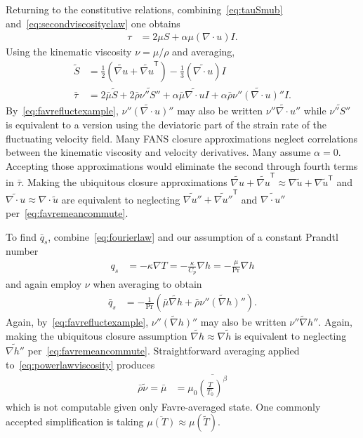 \documentclass[letterpaper,11pt,nointlimits,reqno,draft]{amsart}
\newcommand{\trans}[1]{{#1}^{\ensuremath{\mathsf{T}}}}
\newcommand{\Prandtl}[1][]{\ensuremath{\mbox{Pr}_{#1}}}
\begin{document}
Returning to the constitutive relations, combining~\eqref{eq:tauSmub}
and~\eqref{eq:secondviscosityclaw} one obtains
\begin{align}
  \tau
&= 2 \mu{} S + \alpha \mu \left( \nabla\cdot{}u \right) I.
\end{align}
Using the kinematic viscosity $\nu = \mu / \rho$ and averaging,
\begin{align}
   \tilde{S}
&=
     \frac{1}{2}\left(
       \widetilde{\nabla{}u} + \trans{\widetilde{\nabla{}u}}
     \right)
   - \frac{1}{3}\left(\widetilde{\nabla\cdot{}u}\right) I
\\
  \bar{\tau}
&=
    2 \bar{\mu}\tilde{S}
  + 2 \bar{\rho} \widetilde{\nu''S''}
  + \alpha \bar{\mu} \widetilde{\nabla\cdot{}u} I
  + \alpha \bar{\rho} \widetilde{\nu''\left(\nabla\cdot{}u\right)''} I
.
\end{align}
By~\eqref{eq:favrefluctexample},
$\widetilde{\nu''\left(\nabla\cdot{}u\right)''}$ may also be written
$\widetilde{\nu''\nabla\cdot{}u''}$ while $\widetilde{\nu''S''}$ is equivalent
to a version using the deviatoric part of the strain rate of the fluctuating
velocity field.  Many FANS closure approximations neglect correlations between
the kinematic viscosity and velocity derivatives.  Many assume $\alpha=0$.
Accepting those approximations would eliminate the second through fourth terms
in $\bar{\tau}$.  Making the ubiquitous closure approximations
$\widetilde{\nabla{}u} + \trans{\widetilde{\nabla{}u}} \approx \nabla\tilde{u}
+ \trans{\nabla\tilde{u}}$ and
$\widetilde{\nabla{}\cdot{}u}\approx\nabla\cdot\tilde{u}$ are equivalent to
neglecting $\widetilde{\nabla{}u''} + \trans{\widetilde{\nabla{}u''}}$ and
$\widetilde{\nabla{}\cdot{}u''}$ per~\eqref{eq:favremeancommute}.

To find $\bar{q}_s$, combine~\eqref{eq:fourierlaw} and our assumption of a
constant Prandtl number
\begin{align}
  q_{s} &= - \kappa \nabla{} T
     = - \frac{\kappa}{C_p} \nabla{}h
     = - \frac{\mu}{\Prandtl} \nabla{}h
\end{align}
and again employ $\nu$ when averaging to obtain
\begin{align}
  \bar{q}_s
&= - \frac{1}{\Prandtl}\left(
                \bar{\mu}\widetilde{\nabla{}h}
              + \bar{\rho} \widetilde{\nu''\left(\nabla{}h\right)''}
            \right)
.
\end{align}
Again, by~\eqref{eq:favrefluctexample},
$\widetilde{\nu''\left(\nabla{}h\right)''}$ may also be written
$\widetilde{\nu''\nabla{}h''}$.  Again, making the ubiquitous closure
assumption $\widetilde{\nabla{}h}\approx\nabla\tilde{h}$ is equivalent to
neglecting $\widetilde{\nabla{}h''}$ per~\eqref{eq:favremeancommute}.
Straightforward averaging applied to~\eqref{eq:powerlawviscosity} produces
\begin{align}
   \bar{\rho}\tilde{\nu}
 = \bar{\mu}
&= \mu_0 \overline{\left(\frac{T}{T_0}\right)^\beta}
\end{align}
which is not computable given only Favre-averaged state.  One commonly accepted
simplification is taking $\overline{\mu\left(T\right)} \approx
\mu\left(\tilde{T}\right)$.
\end{document}
